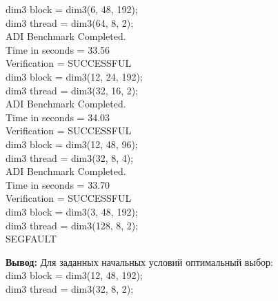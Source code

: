 \documentclass[a4paper,12pt,titlepage,draft]{article}
\begin{document}
\begin{minipage}{.45\textwidth}
    dim3 block = dim3(6, 48, 192);\\
    dim3 thread = dim3(64, 8, 2);\\
    ADI Benchmark Completed.\\
    Time in seconds =             33.56\\
    Verification    =         SUCCESSFUL\\
    
    dim3 block = dim3(12, 24, 192);\\
    dim3 thread = dim3(32, 16, 2);\\
    ADI Benchmark Completed.\\
    Time in seconds =             34.03\\
    Verification    =         SUCCESSFUL\\
    
    dim3 block = dim3(12, 48, 96);\\
    dim3 thread = dim3(32, 8, 4);\\
    ADI Benchmark Completed.\\
    Time in seconds =             33.70\\
    Verification    =         SUCCESSFUL\\
    
    dim3 block = dim3(3, 48, 192);\\
    dim3 thread = dim3(128, 8, 2);\\
    SEGFAULT\\
\end{minipage}

\noindent \textbf{Вывод:} Для заданных начальных условий оптимальный выбор:\\
dim3 block = dim3(12, 48, 192);\\
dim3 thread = dim3(32, 8, 2);
\newpage
\end{document}
